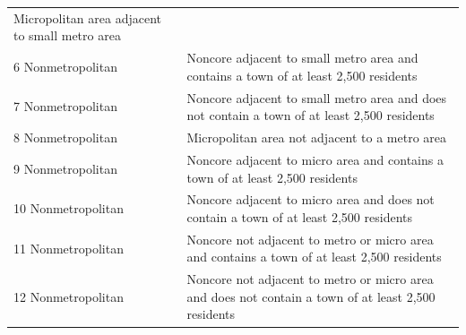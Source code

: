 \documentclass[10pt,]{article}
\begin{document}
\begin{longtable}[]{@{}ll@{}}
\begin{minipage}[t]{0.78\columnwidth}
Micropolitan area adjacent to small metro area\strut
\end{minipage}\tabularnewline
\begin{minipage}[t]{0.16\columnwidth}\raggedright
6 Nonmetropolitan\strut
\end{minipage} & \begin{minipage}[t]{0.78\columnwidth}\raggedright
Noncore adjacent to small metro area and contains a town of at least
2,500 residents\strut
\end{minipage}\tabularnewline
\begin{minipage}[t]{0.16\columnwidth}\raggedright
7 Nonmetropolitan\strut
\end{minipage} & \begin{minipage}[t]{0.78\columnwidth}\raggedright
Noncore adjacent to small metro area and does not contain a town of at
least 2,500 residents\strut
\end{minipage}\tabularnewline
\begin{minipage}[t]{0.16\columnwidth}\raggedright
8 Nonmetropolitan\strut
\end{minipage} & \begin{minipage}[t]{0.78\columnwidth}\raggedright
Micropolitan area not adjacent to a metro area\strut
\end{minipage}\tabularnewline
\begin{minipage}[t]{0.16\columnwidth}\raggedright
9 Nonmetropolitan\strut
\end{minipage} & \begin{minipage}[t]{0.78\columnwidth}\raggedright
Noncore adjacent to micro area and contains a town of at least 2,500
residents\strut
\end{minipage}\tabularnewline
\begin{minipage}[t]{0.16\columnwidth}\raggedright
10 Nonmetropolitan\strut
\end{minipage} & \begin{minipage}[t]{0.78\columnwidth}\raggedright
Noncore adjacent to micro area and does not contain a town of at least
2,500 residents\strut
\end{minipage}\tabularnewline
\begin{minipage}[t]{0.16\columnwidth}\raggedright
11 Nonmetropolitan\strut
\end{minipage} & \begin{minipage}[t]{0.78\columnwidth}\raggedright
Noncore not adjacent to metro or micro area and contains a town of at
least 2,500 residents\strut
\end{minipage}\tabularnewline
\begin{minipage}[t]{0.16\columnwidth}\raggedright
12 Nonmetropolitan\strut
\end{minipage} & \begin{minipage}[t]{0.78\columnwidth}\raggedright
Noncore not adjacent to metro or micro area and does not contain a town
of at least 2,500 residents\strut
\end{minipage}\tabularnewline
\bottomrule
\end{longtable}
\end{document}

